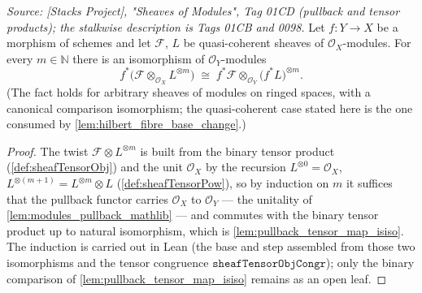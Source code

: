 \begin{lemma}\leanok
  \label{lem:pullback_moduleTensorPow}
  \textit{Source: [Stacks Project], "Sheaves of Modules", Tag 01CD (pullback
  and tensor products); the stalkwise description is Tags 01CB and 0098.}
  Let \(f : Y \to X\) be a morphism of schemes and let \(\mathcal{F}\), \(L\)
  be quasi-coherent sheaves of \(\mathcal{O}_X\)-modules.  For every
  \(m \in \mathbb{N}\) there is an isomorphism of \(\mathcal{O}_Y\)-modules
  \[
    f^*\bigl(\mathcal{F} \otimes_{\mathcal{O}_X} L^{\otimes m}\bigr)
    \;\cong\;
    f^*\mathcal{F} \otimes_{\mathcal{O}_Y} \bigl(f^*L\bigr)^{\otimes m}.
  \]
  (The fact holds for arbitrary sheaves of modules on ringed spaces, with a
  canonical comparison isomorphism; the quasi-coherent case stated here is
  the one consumed by \cref{lem:hilbert_fibre_base_change}.)
\end{lemma}
\begin{proof}
  The twist \(\mathcal{F} \otimes L^{\otimes m}\) is built from the binary
  tensor product (\cref{def:sheafTensorObj}) and the unit
  \(\mathcal{O}_X\) by the recursion \(L^{\otimes 0} = \mathcal{O}_X\),
  \(L^{\otimes (m+1)} = L^{\otimes m} \otimes L\)
  (\cref{def:sheafTensorPow}), so by induction on \(m\) it suffices that the
  pullback functor carries \(\mathcal{O}_X\) to \(\mathcal{O}_Y\) — the
  unitality of \cref{lem:modules_pullback_mathlib} — and commutes with the
  binary tensor product up to natural isomorphism, which is
  \cref{lem:pullback_tensor_map_isiso}.  The induction is carried out in Lean
  (the base and step assembled from those two isomorphisms and the tensor
  congruence \(\texttt{sheafTensorObjCongr}\)); only the binary comparison of
  \cref{lem:pullback_tensor_map_isiso} remains as an open leaf.
\end{proof}


